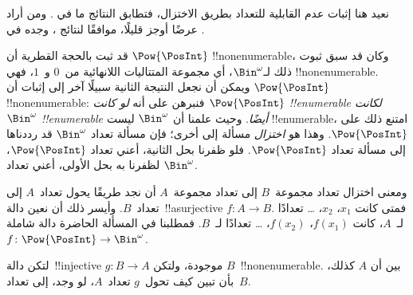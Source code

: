 \documentclass[../../../include/open-logic-section]{subfiles}
\begin{document}


\begin{editorial}
نعيد هنا إثبات عدم القابلية للتعداد بطريق الاختزال، فتطابق النتائج ما في . ومن أراد عرضًا أوجز قليلًا، موافقًا لنتائج ، وجده في .
\end{editorial}

قد ثبت بالحجة القطرية أن $\Pow{\PosInt}$ !!{nonenumerable}، وكان قد سبق ثبوت ذلك لـ$\Bin^\omega$، أي مجموعة المتتاليات اللانهائية من~$0$ و~$1$، فهي !!{nonenumerable}. ويمكن أن نجعل النتيجة الثانية سبيلًا آخر إلى إثبات أن $\Pow{\PosInt}$ !!{nonenumerable}: فنبرهن على أنه \emph{لو كانت $\Pow{\PosInt}$ !!{enumerable} لكانت $\Bin^\omega$ !!{enumerable} أيضًا}. وحيث علمنا أن $\Bin^\omega$ ليست !!{enumerable}، امتنع ذلك على $\Pow{\PosInt}$. وهذا هو \emph{اختزال} مسألة إلى أخرى؛ فإن مسألة تعداد $\Bin^\omega$ قد رددناها إلى مسألة تعداد $\Pow{\PosInt}$. فلو ظفرنا بحل الثانية، أعني تعداد $\Pow{\PosInt}$، لظفرنا به بحل الأولى، أعني تعداد $\Bin^\omega$.

ومعنى اختزال تعداد مجموعة~$B$ إلى تعداد مجموعة~$A$ أن نجد طريقًا يحول تعداد~$A$ إلى تعداد~$B$. وأيسر ذلك أن نعين دالة~!!a{surjective} $f\colon A \to B$. فمتى كانت $x_1$، $x_2$، \dots{} تعدادًا لـ~$A$، كانت $f(x_1)$، $f(x_2)$، \dots{} تعدادًا لـ~$B$. فمطلبنا في المسألة الحاضرة دالة شاملة $f\colon \Pow{\PosInt} \to \Bin^\omega$.

\begin{prob}
لتكن دالة~!!{injective} $g\colon B \to A$ موجودة، ولتكن $B$~!!{nonenumerable}. بين أن $A$ كذلك، بأن تبين كيف تحول~$g$ تعداد~$A$، لو وجد، إلى تعداد~$B$.
\end{prob}
\end{document}
